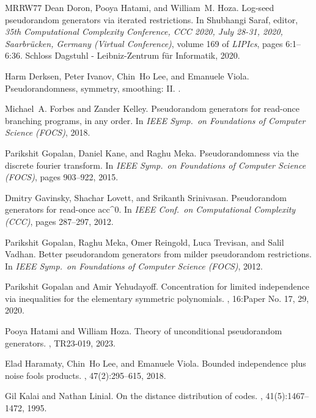\documentclass[10pt,a4paper]{article}
\theoremstyle{definition}
\begin{document}
\begin{thebibliography}{MRRW77}
Dean Doron, Pooya Hatami, and William~M. Hoza.
\newblock Log-seed pseudorandom generators via iterated restrictions.
\newblock In Shubhangi Saraf, editor, {\em 35th Computational Complexity Conference, {CCC} 2020, July 28-31, 2020, Saarbr{\"{u}}cken, Germany (Virtual Conference)}, volume 169 of {\em LIPIcs}, pages 6:1--6:36. Schloss Dagstuhl - Leibniz-Zentrum f{\"{u}}r Informatik, 2020.

Harm Derksen, Peter Ivanov, Chin~Ho Lee, and Emanuele Viola.
\newblock Pseudorandomness, symmetry, smoothing: {II}.
.

Michael~A. Forbes and Zander Kelley.
\newblock Pseudorandom generators for read-once branching programs, in any order.
\newblock In {\em IEEE Symp.~on Foundations of Computer Science (FOCS)}, 2018.

Parikshit Gopalan, Daniel Kane, and Raghu Meka.
\newblock Pseudorandomness via the discrete fourier transform.
\newblock In {\em IEEE Symp.~on Foundations of Computer Science (FOCS)}, pages 903--922, 2015.

Dmitry Gavinsky, Shachar Lovett, and Srikanth Srinivasan.
\newblock Pseudorandom generators for read-once acc{\^{}}0.
\newblock In {\em IEEE Conf.~on Computational Complexity (CCC)}, pages 287--297, 2012.

Parikshit Gopalan, Raghu Meka, Omer Reingold, Luca Trevisan, and Salil Vadhan.
\newblock Better pseudorandom generators from milder pseudorandom restrictions.
\newblock In {\em IEEE Symp.~on Foundations of Computer Science (FOCS)}, 2012.

Parikshit Gopalan and Amir Yehudayoff.
\newblock Concentration for limited independence via inequalities for the elementary symmetric polynomials.
, 16:Paper No. 17, 29, 2020.

Pooya Hatami and William Hoza.
\newblock Theory of unconditional pseudorandom generators.
, {TR23-019}, 2023.

Elad Haramaty, Chin~Ho Lee, and Emanuele Viola.
\newblock Bounded independence plus noise fools products.
, 47(2):295--615, 2018.

Gil Kalai and Nathan Linial.
\newblock On the distance distribution of codes.
, 41(5):1467--1472, 1995.


\end{thebibliography}
\end{document}
